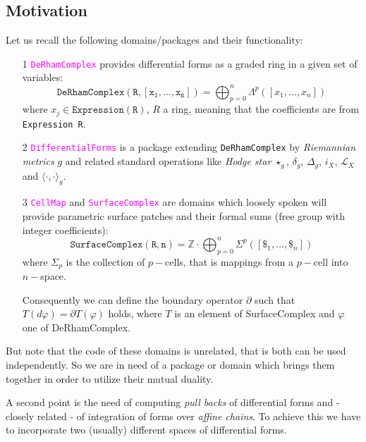 \documentclass[12pt,a4paper]{article}
\newcommand{\spadfun}[1]{\textcolor{magenta}{\tt #1}}
\begin{document}
\subsection{Motivation}
Let us recall the following domains/packages and their functionality:
\begin{itemize}
\item[1] \spadfun{DeRhamComplex} provides differential forms as a
graded ring in a given set of variables:
\begin{displaymath}
  \mathtt{DeRhamComplex(R,[x_1,\ldots,x_n])} =
      \bigoplus_{p=0}^n \Lambda^p([x_1,\ldots,x_n])
\end{displaymath}
where $x_j\in \mathtt{Expression(R)}$, $R$ a ring, meaning that the
coefficients are from {\tt Expression R}.
%
\item[2] \spadfun{DifferentialForms} is a package extending 
{\tt DeRhamComplex} by {\em Riemannian metrics} $g$ and
related standard operations like {\em Hodge star} $\star_g$,
$\delta_g$, $\Delta_g$, $i_X$, $\mathcal{L}_X$ and 
$\langle\cdot,\cdot\rangle_g$.
%
\item[3] \spadfun{CellMap} and \spadfun{SurfaceComplex} are domains
which loosely spoken will provide parametric surface patches and
their formal sums (free group with integer coefficients):
\begin{displaymath}
  \mathtt{SurfaceComplex(R,n)} =
      \mathbb{Z}\cdot\bigoplus_{p=0}^n \Sigma^p([\$_1,\ldots,\$_n])  
\end{displaymath}
where $\Sigma_p$ is the collection of $p-$cells, that is mappings
from a $p-$cell into $n-$space.

Consequently we can define the boundary operator $\partial$ such 
that $T(d\varphi)=\partial T(\varphi)$ holds, where $T$ is an
element of SurfaceComplex and $\varphi$ one of DeRhamComplex.
\end{itemize}
But note that the code of these domains is unrelated, that is
both can be used independently. So we are in need of a package
or domain which brings them together in order to utilize their 
mutual duality.

A second point is the need of computing {\em pull backs} of
differential forms and - closely related - of integration of
forms over {\em affine chains}. To achieve this we have
to incorporate two (usually) different spaces of differential
forms.
\end{document}
